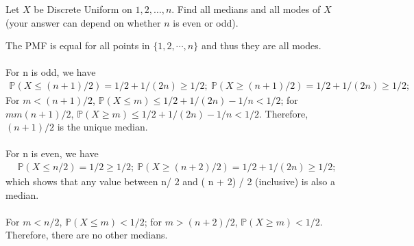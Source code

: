
\setcounter{theorem}{4}
\begin{exercise} [BH.6.5] Let $X$ be Discrete Uniform on $1, 2, \ldots, n$. Find all medians and all modes of $X$ (your answer can depend on whether $n$ is even or odd).

\begin{solution}
    The PMF is equal for all points in $\{1,2,\cdots,n \}$ and thus they are all modes. \\~\\
	For n is odd, we have 
	\begin{align*}
		\mathbb{P}\left(X\leq (n+1)/2 \right) = 1/2 + 1/(2n) \geq 1/2;~
		\mathbb{P}\left(X\geq (n+1)/2 \right) = 1/2 +1/(2n) \geq 1/2;~
	\end{align*}
	For $m<(n+1)/2$, $\mathbb{P}\left(X\leq m \right)\leq 1/2 + 1/(2n) -1/n <1/2 $; for $mm(n+1)/2$, $\mathbb{P}\left(X\geq m \right)\leq 1/2 + 1/(2n) -1/n <1/2 $. Therefore, $ (n+1)/2$ is the unique median. \\~\\
	For n is even, we have 
	\begin{align*}
		\mathbb{P}\left(X\leq n/2 \right) = 1/2  \geq 1/2;~
		\mathbb{P}\left(X\geq (n+2)/2 \right) = 1/2 + 1/(2n)  \geq 1/2;~
	\end{align*}
	which shows that any value between n/ 2 and ( n + 2) / 2 (inclusive) is also a median. \\~\\
	For $m<n/2$, $\mathbb{P}\left(X\leq m \right)  <1/2 $; for $m>(n+2)/2$, $\mathbb{P}\left(X\geq m \right) <1/2 $. Therefore, there are no other medians.
\end{solution}
\end{exercise}

